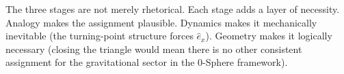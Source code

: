\documentclass[%
 reprint, amsmath,amssymb, aps, prd, ]{revtex4-2}
\numberwithin{equation}{section}
\newcommand{\ehat}[1]{\hat{e}_{#1}}
\begin{document}
The three stages are not merely rhetorical.
Each stage adds a layer of necessity.
Analogy makes the assignment plausible.
Dynamics makes it mechanically inevitable (the turning-point structure forces $\ehat{x}$).
Geometry makes it logically necessary (closing the triangle would mean there is no other consistent assignment for the gravitational sector in the 0-Sphere framework).

\clearpage

\end{document}
